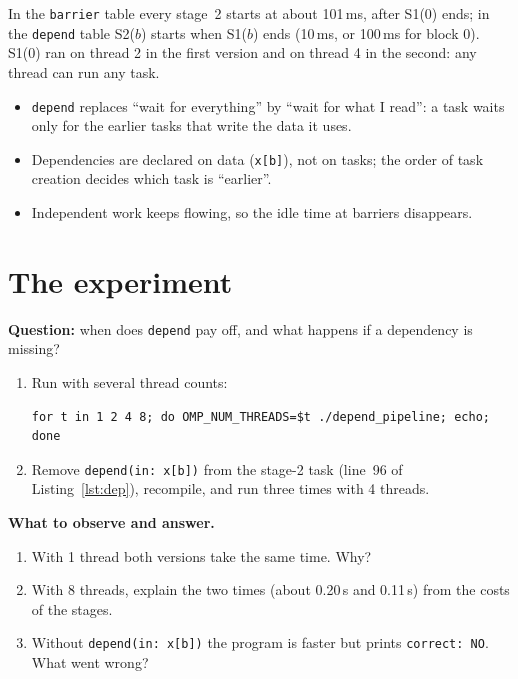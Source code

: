 \documentclass[11pt,a4paper]{article}
\let\origtexttt\texttt
\renewcommand{\texttt}[1]{\textcolor{black!60}{\origtexttt{#1}}}
\begin{document}
In the \texttt{barrier} table every stage~2 starts at about 101\,ms, after S1(0) ends; in the
\texttt{depend} table S2($b$) starts when S1($b$) ends (10\,ms, or 100\,ms for block 0).
S1(0) ran on thread 2 in the first version and on thread 4 in the second: any thread can run any task.

\begin{keyidea}
\begin{itemize}
  \item \texttt{depend} replaces ``wait for everything'' by ``wait for what I read'': a task
        waits only for the earlier tasks that write the data it uses.
  \item Dependencies are declared on data (\texttt{x[b]}), not on tasks; the order of task
        creation decides which task is ``earlier''.
  \item Independent work keeps flowing, so the idle time at barriers disappears.
\end{itemize}
\end{keyidea}

\section{The experiment}
\begin{experiment}
\textbf{Question:} when does \texttt{depend} pay off, and what happens if a dependency is
missing?
\begin{enumerate}
  \item Run with several thread counts:
\begin{lstlisting}[style=sh]
for t in 1 2 4 8; do OMP_NUM_THREADS=$t ./depend_pipeline; echo; done
\end{lstlisting}
  \item Remove \texttt{depend(in: x[b])} from the stage-2 task (line~96 of
        Listing~\ref{lst:dep}), recompile, and run three times with 4 threads.
\end{enumerate}
\textbf{What to observe and answer.}
\begin{enumerate}
  \item With 1 thread both versions take the same time. Why?
  \item With 8 threads, explain the two times (about 0.20\,s and 0.11\,s) from the costs of
        the stages.
  \item Without \texttt{depend(in: x[b])} the program is faster but prints
        \texttt{correct: NO}. What went wrong?
\end{enumerate}
\end{experiment}
\end{document}
